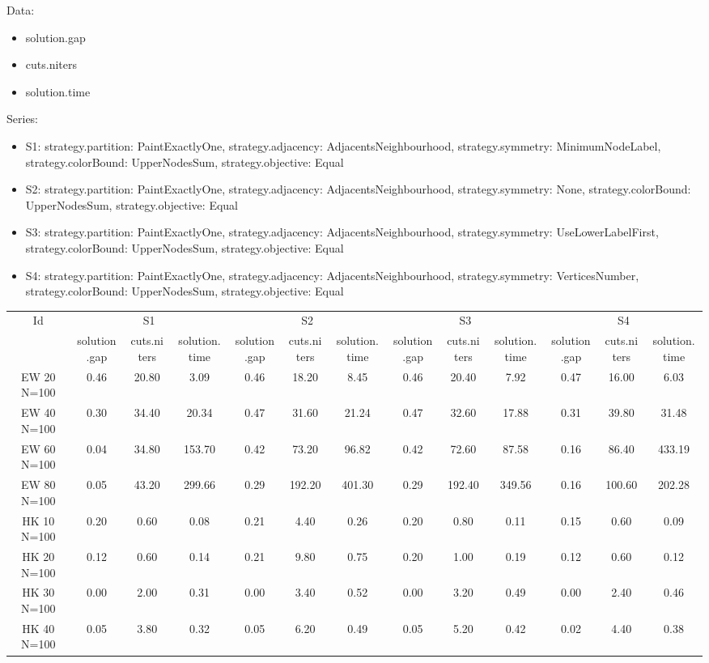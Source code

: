 \documentclass[landscape, 12pt]{report}
\begin{document}
 
Data:
\begin{itemize}
\item solution.gap
\item cuts.niters
\item solution.time
\end{itemize}
Series:
\begin{itemize}
\item S1: strategy.partition: PaintExactlyOne, strategy.adjacency: AdjacentsNeighbourhood, strategy.symmetry: MinimumNodeLabel, strategy.colorBound: UpperNodesSum, strategy.objective: Equal
\item S2: strategy.partition: PaintExactlyOne, strategy.adjacency: AdjacentsNeighbourhood, strategy.symmetry: None, strategy.colorBound: UpperNodesSum, strategy.objective: Equal
\item S3: strategy.partition: PaintExactlyOne, strategy.adjacency: AdjacentsNeighbourhood, strategy.symmetry: UseLowerLabelFirst, strategy.colorBound: UpperNodesSum, strategy.objective: Equal
\item S4: strategy.partition: PaintExactlyOne, strategy.adjacency: AdjacentsNeighbourhood, strategy.symmetry: VerticesNumber, strategy.colorBound: UpperNodesSum, strategy.objective: Equal
\end{itemize}
\begin{tabular}{|c|ccc|ccc|ccc|ccc|}
\hline
\multicolumn{1}{|c|}{Id} & \multicolumn{3}{|c|}{S1} & \multicolumn{3}{|c|}{S2} & \multicolumn{3}{|c|}{S3} & \multicolumn{3}{|c|}{S4}
\\
 & solution.gap & cuts.niters & solution.time & solution.gap & cuts.niters & solution.time & solution.gap & cuts.niters & solution.time & solution.gap & cuts.niters & solution.time
\\
\hline
EW 20 N=100 & 0.46 & 20.80 & 3.09 & 0.46 & 18.20 & 8.45 & 0.46 & 20.40 & 7.92 & 0.47 & 16.00 & 6.03
\\
EW 40 N=100 & 0.30 & 34.40 & 20.34 & 0.47 & 31.60 & 21.24 & 0.47 & 32.60 & 17.88 & 0.31 & 39.80 & 31.48
\\
EW 60 N=100 & 0.04 & 34.80 & 153.70 & 0.42 & 73.20 & 96.82 & 0.42 & 72.60 & 87.58 & 0.16 & 86.40 & 433.19
\\
EW 80 N=100 & 0.05 & 43.20 & 299.66 & 0.29 & 192.20 & 401.30 & 0.29 & 192.40 & 349.56 & 0.16 & 100.60 & 202.28
\\
HK 10 N=100 & 0.20 & 0.60 & 0.08 & 0.21 & 4.40 & 0.26 & 0.20 & 0.80 & 0.11 & 0.15 & 0.60 & 0.09
\\
HK 20 N=100 & 0.12 & 0.60 & 0.14 & 0.21 & 9.80 & 0.75 & 0.20 & 1.00 & 0.19 & 0.12 & 0.60 & 0.12
\\
HK 30 N=100 & 0.00 & 2.00 & 0.31 & 0.00 & 3.40 & 0.52 & 0.00 & 3.20 & 0.49 & 0.00 & 2.40 & 0.46
\\
HK 40 N=100 & 0.05 & 3.80 & 0.32 & 0.05 & 6.20 & 0.49 & 0.05 & 5.20 & 0.42 & 0.02 & 4.40 & 0.38
\\
\hline 
 \end{tabular}
 
\end{document}
